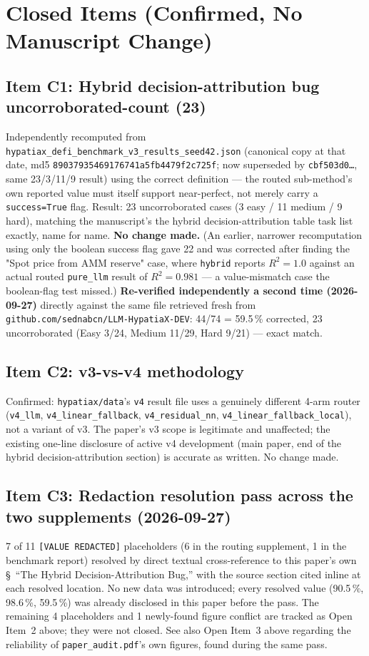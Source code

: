 \documentclass[11pt]{article}
\newcommand{\Rsq}{R^{2}}
\begin{document}
\section{Closed Items (Confirmed, No Manuscript Change)}

\subsection*{Item C1: Hybrid decision-attribution bug uncorroborated-count (23)}
Independently recomputed from \texttt{hypatiax\_defi\_benchmark\_v3\_results\_seed42.json}
(canonical copy at that date, md5 \texttt{89037935469176741a5fb4479f2c725f}; now superseded by \texttt{cbf503d0\ldots}, same 23/3/11/9 result) using the
correct definition — the routed sub-method's own reported value must itself
support near-perfect, not merely carry a \texttt{success=True} flag. Result:
23 uncorroborated cases (3 easy / 11 medium / 9 hard), matching the manuscript's
the hybrid decision-attribution table task list exactly, name for name.
\textbf{No change made.} (An earlier, narrower recomputation using only the
boolean success flag gave 22 and was corrected after finding the
"Spot price from AMM reserve" case, where \texttt{hybrid} reports
$\Rsq{=}1.0$ against an actual routed \texttt{pure\_llm} result of
$\Rsq{=}0.981$ — a value-mismatch case the boolean-flag test missed.)
\textbf{Re-verified independently a second time (2026-09-27)} directly
against the same file retrieved fresh from
\texttt{github.com/sednabcn/LLM-HypatiaX-DEV}: 44/74 = 59.5\,\% corrected,
23 uncorroborated (Easy 3/24, Medium 11/29, Hard 9/21) — exact match.

\subsection*{Item C2: v3-vs-v4 methodology}
Confirmed: \texttt{hypatiax/data}'s \texttt{v4} result file uses a genuinely
different 4-arm router (\texttt{v4\_llm}, \texttt{v4\_linear\_fallback},
\texttt{v4\_residual\_nn}, \texttt{v4\_linear\_fallback\_local}), not a variant
of v3. The paper's v3 scope is legitimate and unaffected; the existing
one-line disclosure of active v4 development (main paper, end of
the hybrid decision-attribution section) is accurate as written. No change made.

\subsection*{Item C3: Redaction resolution pass across the two supplements
(2026-09-27)}
7 of 11 \texttt{[VALUE REDACTED]} placeholders (6 in the routing
supplement, 1 in the benchmark report) resolved by direct textual
cross-reference to this paper's own \S~``The Hybrid
Decision-Attribution Bug,'' with the source section cited inline at each
resolved location. No new data was introduced; every resolved value
(90.5\,\%, 98.6\,\%, 59.5\,\%) was already disclosed in this paper before
the pass. The remaining 4 placeholders and 1 newly-found figure conflict
are tracked as Open Item~2 above; they were not closed. See also Open
Item~3 above regarding the reliability of \texttt{paper\_audit.pdf}'s own
figures, found during the same pass.
\end{document}
